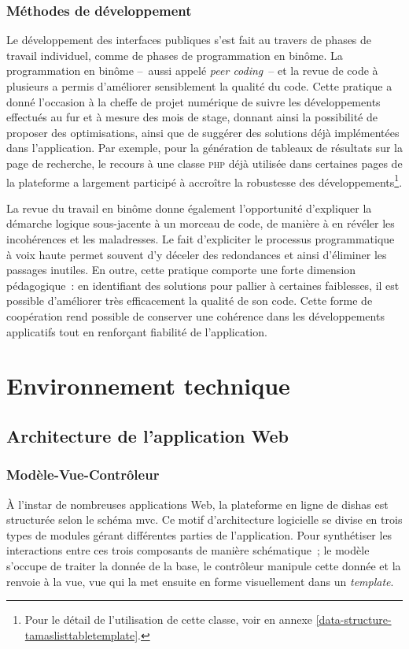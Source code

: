 \documentclass[a4paper,12pt,twoside]{book}
\newcommand{\clearemptydoublepage}{\newpage{\pagestyle{empty}\cleardoublepage}}
\newcommand{\eng}{\emph}
\newcommand{\php}{\textsc{php}\xspace}
\newcommand{\dishas}{\gls{dishas}\xspace}
\newcommand{\mvc}{\gls{mvc}\xspace}
\begin{document}
		\subsection{Méthodes de développement}
Le développement des interfaces publiques s'est fait au travers de phases de travail individuel, comme de phases de programmation en binôme. La programmation en binôme –~aussi appelé \eng{peer coding}~– et la revue de code à plusieurs a permis d'améliorer sensiblement la qualité du code. Cette pratique a donné l'occasion à la cheffe de projet numérique de suivre les développements effectués au fur et à mesure des mois de stage, donnant ainsi la possibilité de proposer des optimisations, ainsi que de suggérer des solutions déjà implémentées dans l'application. Par exemple, pour la génération de tableaux de résultats sur la page de recherche, le recours à une classe \php déjà utilisée dans certaines pages de la plateforme a largement participé à accroître la robustesse des développements\footnote{Pour le détail de l'utilisation de cette classe, voir en annexe \ref{data-structure-tamaslisttabletemplate}.}.

La revue du travail en binôme donne également l'opportunité d'expliquer la démarche logique sous-jacente à un morceau de code, de manière à en révéler les incohérences et les maladresses. Le fait d'expliciter le processus programmatique à voix haute permet souvent d'y déceler des redondances et ainsi d'éliminer les passages inutiles. En outre, cette pratique comporte une forte dimension pédagogique~: en identifiant des solutions pour pallier à certaines faiblesses, il est possible d'améliorer très efficacement la qualité de son code. Cette forme de coopération rend possible de conserver une cohérence dans les développements applicatifs tout en renforçant fiabilité de l'application.

\clearemptydoublepage

\chapter{Environnement technique}
	\section{Architecture de l'application Web}
		\subsection{Modèle-Vue-Contrôleur}
À l'instar de nombreuses applications Web, la plateforme en ligne de \dishas est structurée selon le schéma \mvc. Ce motif d'architecture logicielle se divise en trois types de modules gérant différentes parties de l'application. Pour synthétiser les interactions entre ces trois composants de manière schématique~; le modèle s'occupe de traiter la donnée de la base, le contrôleur manipule cette donnée et la renvoie à la vue, vue qui la met ensuite en forme visuellement dans un \eng{template}.
\end{document}
